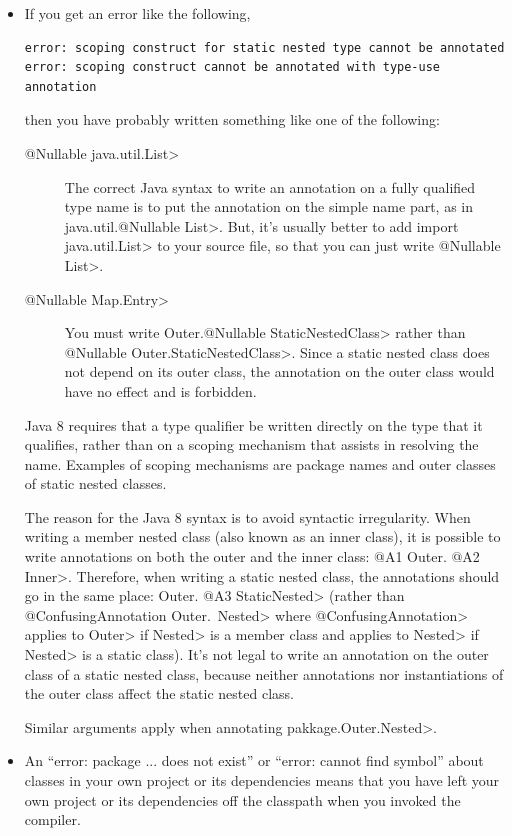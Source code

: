 \begin{itemize}

\item
If you get an error like the following,

\begin{Verbatim}
error: scoping construct for static nested type cannot be annotated
error: scoping construct cannot be annotated with type-use annotation
\end{Verbatim}

\noindent
  then you have probably written something like one of the following:
\begin{description}
\item[\<@Nullable java.util.List>]
The correct Java syntax to write an annotation on a fully qualified type
name is to put the annotation on the simple name part, as in
\<java.util.@Nullable List>.  But, it's usually
better to add \<import java.util.List> to your source file, so that you can
just write \<@Nullable List>.
\item[\<@Nullable Map.Entry>]  You must write \<Outer.@Nullable
StaticNestedClass> rather than \<@Nullable Outer.StaticNestedClass>.
Since a static nested class does not depend on its outer class, the
annotation on the outer class would have no effect and is forbidden.
\end{description}

Java 8 requires that a type qualifier be written directly on the type that
it qualifies, rather than on a scoping mechanism that assists in resolving
the name.  Examples of scoping mechanisms are package names and outer
classes of static nested classes.

The reason for the Java 8 syntax is to avoid syntactic irregularity.  When
writing a member nested class (also known as an inner class), it is
possible to write annotations on both the outer and the inner class:  \<@A1
Outer. @A2 Inner>.  Therefore, when writing a static nested class, the
annotations should go in the same place:  \<Outer. @A3 StaticNested> (rather
than \<@ConfusingAnnotation Outer.\ Nested> where
\<@ConfusingAnnotation> applies to \<Outer> if \<Nested> is a member class
and applies to \<Nested> if \<Nested> is a static class).  It's not legal
to write an annotation on the outer class of a static nested class, because
neither annotations nor instantiations of the outer class affect the static
nested class.

Similar arguments apply when annotating \<pakkage.Outer.Nested>.

\item
An ``error: package ... does not exist'' or ``error: cannot find symbol''
about classes in your own project or its dependencies means that you have
left your own project or its dependencies off the classpath when you
invoked the compiler.

\end{itemize}



